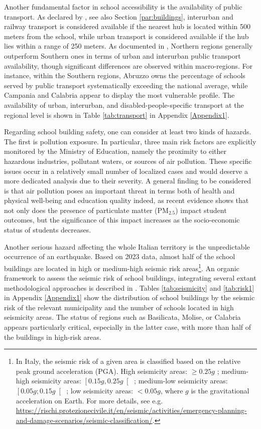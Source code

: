 \documentclass{article}%
\begin{document}
Another fundamental factor in school accessibility is the availability of public transport. As declared by \cite{MIUR}, see also Section \ref{par:buildings}, interurban and railway transport is considered available if the nearest hub is located within 500 meters from the school, while urban transport is considered available if the hub lies within a range of 250 meters. As documented in \cite{Garlaschi}, Northern regions generally outperform Southern ones in terms of urban and interurban public transport availability, though significant differences are observed within macro-regions. For instance, within the Southern regions, Abruzzo owns the percentage of schools served by public transport systematically exceeding the national average, while Campania and Calabria appear to display the most vulnerable profile. The availability of urban, interurban, and disabled-people-specific transport at the regional level is shown in Table \ref{tab:transport} in Appendix \ref{Appendix1}.

Regarding school building safety, one can consider at least two kinds of hazards. The first is pollution exposure. In particular, three main risk factors are explicitly monitored by the Ministry of Education, namely the proximity to either hazardous industries, pollutant waters, or sources of air pollution. These specific issues occur in a relatively small number of localized cases and would deserve a more dedicated analysis due to their severity. A general finding to be considered is that air pollution poses an important threat in terms both of health and physical well-being and education quality indeed, as recent evidence \citep{AQInvalsi} shows that not only does the presence of particulate matter (PM$_{2.5}$)  impact student outcomes, but the significance of this impact increases as the socio-economic status of students decreases.

Another serious hazard affecting the whole Italian territory is the unpredictable occurrence of an earthquake. Based on 2023 data, almost half of the school buildings are located in high or medium-high seismic risk areas\footnote{In Italy, the seismic risk of a given area is classified based on the relative peak ground acceleration (PGA). High seismicity areas: $\geq 0.25 g$ ; medium-high seismicity areas: $\left[ 0.15g, 0.25 g \right[$ ; medium-low seismicity areas: $\left[ 0.05g; 0.15 g \right[$ ; low seismicity areas: $< 0.05 g$, where $g$ is the gravitational acceleration on Earth. For more details, see e.g. \url{https://rischi.protezionecivile.it/en/seismic/activities/emergency-planning-and-damage-scenarios/seismic-classification/}.}. An organic framework to assess the seismic risk of school buildings, integrating several extant methodological approaches is described in \cite{MARS}. Tables \ref{tab:seismicity} and \ref{tab:risk1} in Appendix \ref{Appendix1} show the distribution of school buildings by the seismic risk of the relevant municipality and the number of schools located in high seismicity areas. The status of regions such as Basilicata, Molise, or Calabria appears particularly critical, especially in the latter case, with more than half of the buildings in high-risk areas. 
\end{document}
